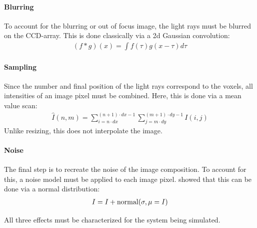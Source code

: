 \paragraph{Blurring}
To account for the blurring or out of focus image, the light rays must be blurred on the \ac{CCD}-array.
This is done classically via a 2d Gaussian convolution:
\begin{align}
    (f * g)(x) = \int f(\tau)g(x-\tau)d\tau
\end{align}
%
\paragraph{Sampling}
Since the number and final position of the light rays correspond to the voxels, all intensities of an image pixel must be combined.
Here, this is done via a mean value scan:
\begin{align}
    \hat{I}(n,m) = \sum_{i=n \cdot dx}^{(n+1) \cdot dx-1}\sum_{j=m \cdot dy}^{(m+1) \cdot dy-1} I(i,j)
\end{align}
Unlike resizing, this does not interpolate the image.
%
\paragraph{Noise}
The final step is to recreate the noise of the image composition.
To account for this, a noise model must be applied to each image pixel.
\cite{Wiese:887678} showed that this can be done via a normal distribution:
%
\begin{align}
    I = I + \operatorname{normal}(\sigma, \mu=I)
\end{align}
%
\par
%
All three effects must be characterized for the system being simulated.
%
%
%
